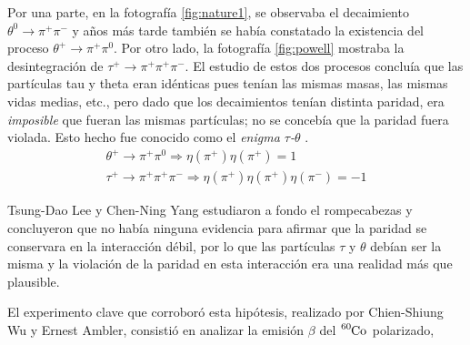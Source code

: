 Por una parte, en la fotografía \ref{fig:nature1}, se observaba el decaimiento $\theta^{0} \rightarrow \pi^{+}\pi^{-}$ y años más tarde también se había constatado la existencia del proceso $\theta^{+} \rightarrow \pi^{+}\pi^{0}$. Por otro lado, la fotografía \ref{fig:powell} mostraba la desintegración de $\tau^+ \rightarrow \pi^{+}\pi^{+}\pi^{-}$.  El estudio de estos dos procesos concluía que las partículas tau y theta eran idénticas pues tenían las mismas masas, las mismas vidas medias, etc., pero dado que los decaimientos tenían distinta paridad, era \textit{imposible} que fueran las mismas partículas; no se concebía que la paridad fuera violada. Esto hecho fue conocido como el \textit{enigma $\tau$-$\theta$} \cite{Ferbel}.
\begin{equation}
\begin{gathered}
\theta^{+} \rightarrow \pi^{+}\pi^{0} \Rightarrow \eta\left(\pi^{+}\right) \eta\left(\pi^{+}\right) = 1 \\ 
\tau^{+} \rightarrow \pi^{+}\pi^{+}\pi^{-} \Rightarrow \eta\left(\pi^{+}\right) \eta\left(\pi^{+}\right) \eta\left(\pi^{-}\right) = -1
\end{gathered}
\end{equation}

Tsung-Dao Lee y Chen-Ning Yang estudiaron a fondo el rompecabezas y concluyeron que no había ninguna evidencia para afirmar que la paridad se conservara en la interacción débil, por lo que las partículas $\tau$ y $\theta$ debían ser la misma y la violación de la paridad en esta interacción era una realidad más que plausible. 

El experimento clave que corroboró esta hipótesis,  realizado por Chien-Shiung Wu y Ernest Ambler, consistió en analizar la emisión $\beta$ del $\tensor*[^{60}]{\mathrm{Co}}{}$ polarizado,



